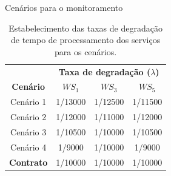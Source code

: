 \documentclass[xcolor=svgnames]{beamer}
\newcommand {\otoprule}{\midrule [\heavyrulewidth]}  %
\begin{document}
  \begin{frame}{Cenários para o monitoramento}
    \begin{center}
      \begin{table}[h]
	  \centering
	\caption{ Estabelecimento das taxas de degradação de tempo de processamento dos serviços para os cenários.  }
	\begin{center}
	  \begin{tabular}{ cccc}
	    \toprule[1pt]
			&   \multicolumn{3}{c}{ \textbf{Taxa de degradação ($\lambda$)} } \\
	    \textbf{Cenário}    &    $WS_1$	  &	  $WS_3$ 	& 	 $WS_5$ \\
	    \midrule[1pt]
	    
	    Cenário 1 &		\cellcolor{red!25} 1/13000  	 & 	\cellcolor{red!25} 1/12500		&	\cellcolor{red!25} 1/11500	\\
	    Cenário 2 &		\cellcolor{red!25} 1/12000  	 & 	\cellcolor{red!25} 1/11000		&	\cellcolor{red!25} 1/12000	\\
	    \midrule
	    Cenário 3 &		\cellcolor{green!25} 1/10500  	 & 	\cellcolor{green!25} 1/10000		&	\cellcolor{green!25} 1/10500	\\
	    Cenário 4 &		\cellcolor{green!25} 1/9000  	 & 	\cellcolor{green!25} 1/10000		&	\cellcolor{green!25} 1/9000	\\
	    \midrule[1pt]
	    \textbf{Contrato}  &	\cellcolor{yellow!49} 1/10000		&	\cellcolor{yellow!49} 1/10000		&	\cellcolor{yellow!49} 1/10000 \\
	    \bottomrule[1pt]
      
	  \end{tabular}
	  \label{table:scenarios_rates}
	  \end{center}
      \end{table}
    \end{center}
  \end{frame}
\end{document}
